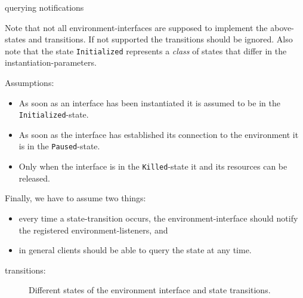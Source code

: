 \documentclass[a4]{article}
\begin{document}
querying
notifications

Note that not all environment-interfaces are supposed to implement the above-states and transitions. If not supported the transitions should be ignored.
Also note that the state \texttt{Initialized} represents a \emph{class} of states that differ in the instantiation-parameters.

Assumptions:
\begin{itemize}
\item As soon as an interface has been instantiated it is assumed to be in the \texttt{Initialized}-state.
\item As soon as the interface has established its connection to the environment
it is in the \texttt{Paused}-state.
\item Only when the interface is in the \texttt{Killed}-state it and its resources can be released.
\end{itemize}

Finally, we have to assume two things:
\begin{itemize}
\item every time a state-transition occurs, the environment-interface should notify the registered environment-listeners, and
\item in general clients should be able to query the state at any time.
\end{itemize}


transitions:

\begin{figure}[h]\centering
{}
\caption{Different states of the environment interface and state transitions.}
\end{figure}
\end{document}
